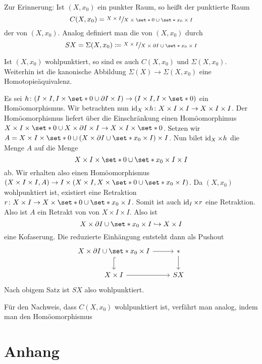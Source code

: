 Zur Erinnerung: Ist $(X,x_0)$ ein punkter Raum, so heißt der punktierte Raum 
\[
	C(X,x_0) = \sfrac{X \times I}{X \times \set*{0} \cup \set*{x_0} \times I}
\]
der  von $(X,x_0)$.
Analog definiert man die  von $(X,x_0)$ durch
\[
	S X =\Sigma(X,x_0) \coloneqq \sfrac{X \times I}{X \times \partial I \cup \set*{x_0} \times I}
\]

\begin{satz}
	Ist $(X,x_0)$ wohlpunktiert, so sind es auch $C(X,x_0)$ und $\Sigma(X,x_0)$.
	Weiterhin ist die kanonische Abbildung $\Sigma(X) \to \Sigma(X,x_0)$ eine Homotopieäquivalenz.
\end{satz}
\begin{beweis}
	Es sei $h \colon (I \times I,I \times \set*{0} \cup \partial I \times I) \to (I \times I, I \times \set*{0})$ ein Homöomorphismus.
	Wir betrachten nun $\operatorname{id}_X \times h \colon X \times I \times I \to X \times I \times I$.
	Der Homöomorphismus liefert über die Einschränkung einen Homöomorphimus $X \times I \times \set*{0} \cup X \times \partial I \times I \to X \times I \times \set*{0}$.
	Setzen wir $A=X \times I \times \set*{0} \cup \enbrace*{X \times \partial I\cup \set*{x_0} \times I} \times I$.
	Nun bilet $\operatorname{id}_X \times h$ die Menge $A$ auf die Menge
	\[
		X \times I \times \set*{0} \cup \set*{x_0} \times I \times I
	\]
	ab.
	Wir erhalten also einen Homöomorphismus $(X \times I \times I,A) \to I \times \enbrace*{X \times I,X \times \set*{0} \cup \set*{x_0} \times I}$.
	Da $(X,x_0)$ wohlpunktiert ist, existiert eine Retraktion $r \colon X \times I \to X \times \set*{0} \cup \set*{x_0} \times I$.
	Somit ist auch $\operatorname{id}_I \times r$ eine Retraktion.
	Also ist $A$ ein Retrakt von von $X \times I \times I$.
	Also ist 
	\[
		X \times \partial I \cup \set*{x_0} \times I \hookrightarrow X \times I
	\]
	eine Kofaserung.
	Die reduzierte Einhängung entsteht dann als Pushout
	\[
		\begin{tikzcd}
			X \times \partial I \cup \set*{x_0} \times I \rar \dar[hook] & * \dar\\
			X \times I \rar & SX
		\end{tikzcd}
	\]
	Nach obigem Satz ist $SX$ also wohlpunktiert.
	
	Für den Nachweis, dass $C(X,x_0)$ wohlpunktiert ist, verfährt man analog, indem man den Homöomorphismus 
\end{beweis}

\cleardoubleoddemptypage
{}
\setcounter{page}{1}
\cleardoubleoddemptypage
\appendix

\section{Anhang} %
\label{sec:anhang}

\printindex
\printbibliography
\listoffigures
\todototoc
{}

